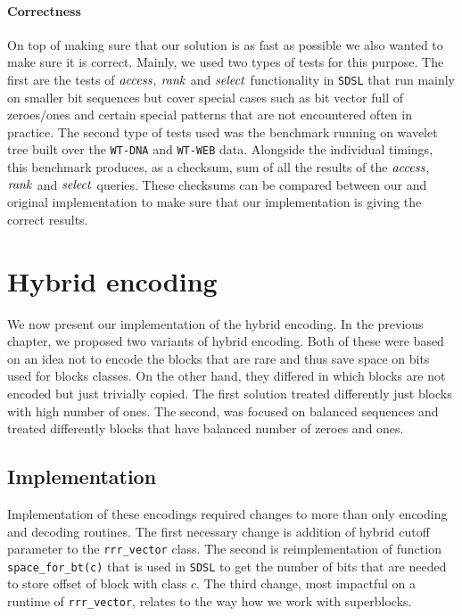 \paragraph{Correctness}

On top of making sure that our solution is as fast as possible we also wanted to make sure it is
correct. Mainly, we used two types of tests for this purpose. The first are the tests of $\mathit{access}$,
$\mathit{rank}$ and $\mathit{select}$ functionality in \texttt{SDSL} that run mainly on smaller bit sequences
but cover special cases such as bit vector full of zeroes/ones and certain special patterns
that are not encountered often in practice. The second type of tests used was the benchmark
running on wavelet tree built over the \texttt{WT-DNA} and \texttt{WT-WEB} data. Alongside
the individual timings, this benchmark produces, as a checksum, sum of all the results of the
$\mathit{access}$, $\mathit{rank}$ and $\mathit{select}$ queries. These checksums can be compared between our and original
implementation to make sure that our implementation is giving the correct results.

\section{Hybrid encoding}

We now present our implementation of the hybrid encoding. In the previous chapter, we
proposed two variants of hybrid encoding. Both of these were based on an idea not to
encode the blocks that are rare and thus save space on bits used for blocks classes. On
the other hand, they differed in which blocks are not encoded but just trivially copied.
The first solution treated differently just blocks with high number of ones. The second,
was focused on balanced sequences and treated differently blocks that have balanced number
of zeroes and ones.

\subsection{Implementation}

Implementation of these encodings required changes to more than only encoding and decoding
routines. The first necessary change is addition of hybrid cutoff parameter
to the \texttt{rrr\_vector} class. The second is reimplementation of function
\texttt{space\_for\_bt(c)} that is used in \texttt{SDSL} to get the number of bits that are
needed to store offset of block with class $c$. The third change, most impactful on a runtime
of \texttt{rrr\_vector}, relates to the way how we work with superblocks.

